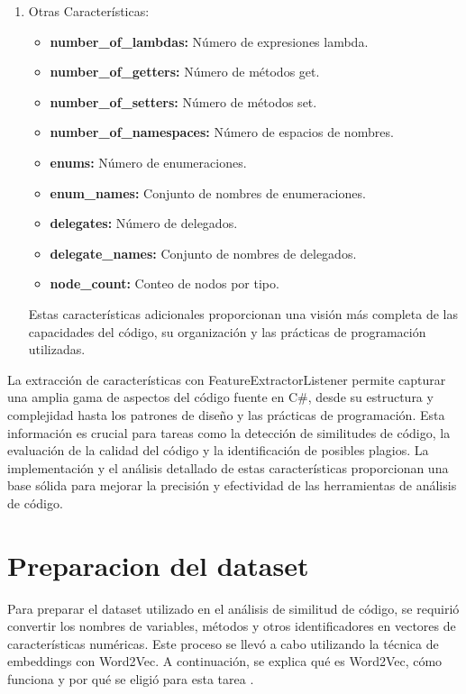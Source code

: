 \begin{enumerate}
    \item Otras Características:
    \begin{itemize}
        \item {\bf number\_of\_lambdas:} Número de expresiones lambda.
        \item {\bf number\_of\_getters:} Número de métodos get.
        \item {\bf number\_of\_setters:} Número de métodos set.
        \item {\bf number\_of\_namespaces:} Número de espacios de nombres.
        \item {\bf enums:} Número de enumeraciones.
        \item {\bf enum\_names:} Conjunto de nombres de enumeraciones.
        \item {\bf delegates:} Número de delegados.
        \item {\bf delegate\_names:} Conjunto de nombres de delegados.
        \item {\bf node\_count:} Conteo de nodos por tipo.
    \end{itemize}
    Estas características adicionales proporcionan una visión más completa de las capacidades del código, su organización y las prácticas de programación utilizadas.

 
\end{enumerate}
    
        
La extracción de características con FeatureExtractorListener permite capturar una amplia gama de aspectos del código fuente en C\#, desde su estructura y complejidad hasta los patrones de diseño y las prácticas de programación. Esta información es crucial para tareas como la detección de similitudes de código, la evaluación de la calidad del código y la identificación de posibles plagios. La implementación y el análisis detallado de estas características proporcionan una base sólida para mejorar la precisión y efectividad de las herramientas de análisis de código.

\section{Preparacion del dataset}

Para preparar el dataset utilizado en el análisis de similitud de código, se requirió convertir los nombres de variables, métodos y otros identificadores en vectores de características numéricas. Este proceso se llevó a cabo utilizando la técnica de embeddings con Word2Vec. A continuación, se explica qué es Word2Vec, cómo funciona y por qué se eligió para esta tarea \cite{mikolov2013efficient}. \\

